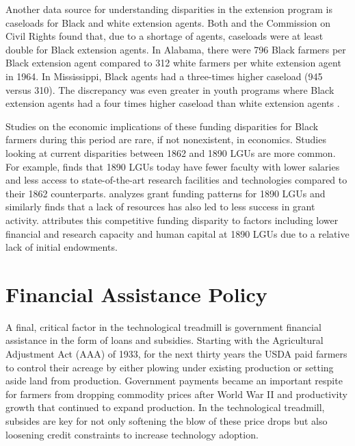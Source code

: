 \documentclass[12pt]{article}
\begin{document}
Another data source for understanding disparities in the extension program is caseloads for Black and white extension agents. 
Both \citet{wilkerson_agricultural_1942} and the Commission on Civil Rights found that, due to a shortage of agents, caseloads were at least double for Black extension agents. 
In Alabama, there were 796 Black farmers per Black extension agent compared to 312 white farmers per white extension agent in 1964. 
In Mississippi, Black agents had a three-times higher caseload (945 versus 310). The discrepancy was even greater in youth programs where Black extension agents had a four times higher caseload than white extension agents \citep[pg. 43]{us_commission_on_civil_rights_equal_1965}. 

Studies on the economic implications of these funding disparities for Black farmers during this period are rare, if not nonexistent, in economics.
Studies looking at current disparities between 1862 and 1890 LGUs are more common.
For example, \citet{grant_overview_2024} finds that 1890 LGUs today have fewer faculty with lower salaries and less access to state-of-the-art research facilities and technologies compared to their 1862 counterparts. \citet{wilson_distribution_2024} analyzes grant funding patterns for 1890 LGUs and similarly finds that a lack of resources has also led to less success in grant activity. 
\citet{wilson_distribution_2024} attributes this competitive funding disparity to factors including lower financial and research capacity and human capital at 1890 LGUs due to a relative lack of initial endowments.

\section*{Financial Assistance Policy}
A final, critical factor in the technological treadmill is government financial assistance in the form of loans and subsidies.
Starting with the Agricultural Adjustment Act (AAA) of 1933, for the next thirty years the USDA paid farmers to control their acreage by either plowing under existing production or setting aside land from production. 
Government payments became an important respite for farmers from dropping commodity prices after World War II and productivity growth that continued to expand production.
In the technological treadmill, subsides are key for not only softening the blow of these price drops but also loosening credit constraints to increase technology adoption.
\end{document}
